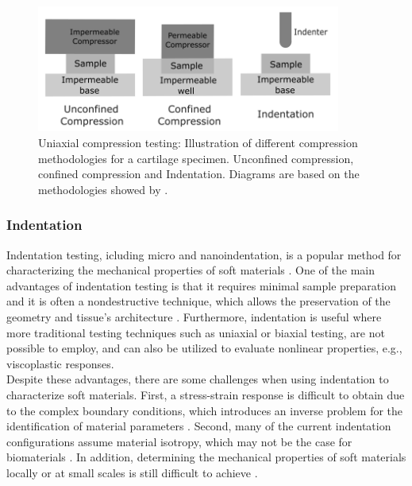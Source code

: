 \begin{figure}%
        \centering
       \quad
       \includegraphics[width=10cm]{Images/chapter1/compressiontypes.png}%
       \caption[Uniaxial compression testing methodologies showed by \citet{Griffin2016}]{Uniaxial compression testing: Illustration of different compression methodologies for a cartilage specimen. Unconfined compression, confined compression and Indentation. Diagrams are based on the methodologies showed by \citet{Griffin2016}.}%
       \label{fig:compressiontypes}%
\end{figure}

\subsubsection*{Indentation}
Indentation testing, icluding micro and nanoindentation, is a popular method for characterizing 
the mechanical properties of soft materials \cite{Wu2016}. One of the main advantages of 
indentation testing is that it requires minimal sample preparation and it is often a 
nondestructive technique, which allows the preservation of the geometry and tissue's architecture \cite{Shi2019}.
Furthermore, indentation is useful where more traditional testing techniques such as 
uniaxial or biaxial testing, are not possible to employ, 
and can also be utilized to evaluate nonlinear properties, e.g., viscoplastic responses\cite{Bergström2015}.\\

Despite these advantages, there are some challenges when using indentation to 
characterize soft materials. First, a stress-strain response is difficult to
obtain due to the complex boundary conditions, which introduces an inverse problem 
for the identification of material parameters \cite{Shi2019}. Second, many of the current 
indentation configurations assume material isotropy, which may not be the case for biomaterials \cite{Feng2017}.
In addition, determining the mechanical properties of soft materials locally or at small scales is still difficult to achieve \cite{Zhang2014}.


